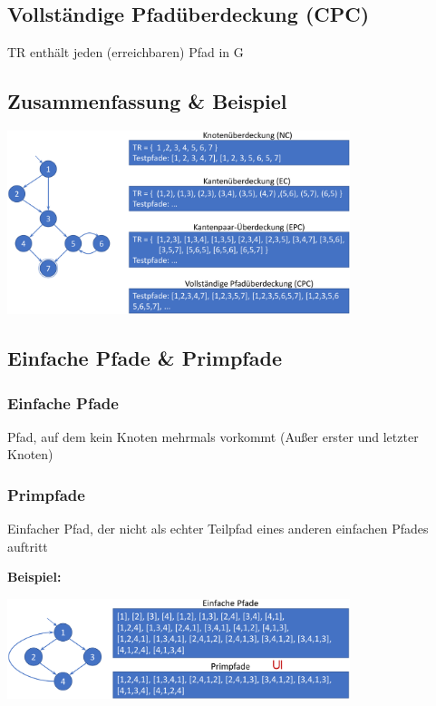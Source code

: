 \documentclass[11pt, a4paper]{article}
\begin{document}
\subsection{Vollständige Pfadüberdeckung (CPC)}

TR enthält jeden (erreichbaren) Pfad in G

\newpage

\subsection*{Zusammenfassung \& Beispiel}

\centering \includegraphics[width=0.75\textwidth]{Graphen-05.png} 

\raggedright



\subsection{Einfache Pfade \& Primpfade}\label{subsec:EinfachePfadePrimPfade}

\subsubsection*{Einfache Pfade}

Pfad, auf dem kein Knoten mehrmals vorkommt (Außer erster und letzter Knoten)

\subsubsection*{Primpfade}

Einfacher Pfad, der nicht als echter Teilpfad eines anderen einfachen Pfades auftritt

\vspace{2em}

\textbf{Beispiel:}

\centering \includegraphics[width=0.75\textwidth]{Graphen-06.png} 
\end{document}

